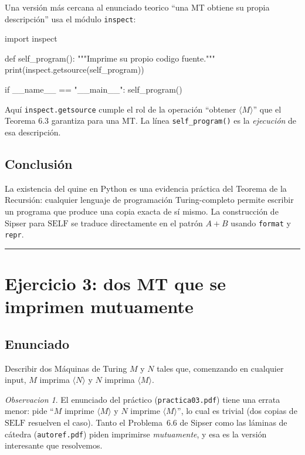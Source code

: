\documentclass[11pt,a4paper]{article}
\theoremstyle{plain}
\theoremstyle{definition}
\theoremstyle{remark}
\newtheorem*{observacion}{Observacion}
\newcommand{\enc}[1]{\langle #1\rangle}
\newcommand{\SELF}{\mathrm{SELF}}
\begin{document}
Una versi\'on m\'as cercana al enunciado teorico ``una MT obtiene su propia
descripci\'on'' usa el m\'odulo \texttt{inspect}:

\begin{pycode}
import inspect

def self_program():
    """Imprime su propio codigo fuente."""
    print(inspect.getsource(self_program))

if __name__ == "__main__":
    self_program()
\end{pycode}

Aqu\'i \texttt{inspect.getsource} cumple el rol de la operaci\'on
``obtener $\enc{M}$'' que el Teorema 6.3 garantiza para una MT. La l\'inea
\texttt{self\_program()} es la \emph{ejecuci\'on} de esa descripci\'on.

\subsection*{Conclusi\'on}

La existencia del quine en Python es una evidencia pr\'actica del Teorema de
la Recursi\'on: cualquier lenguaje de programaci\'on Turing-completo permite
escribir un programa que produce una copia exacta de s\'i mismo. La
construcci\'on de Sipser para $\SELF$ se traduce directamente en el patr\'on
$A+B$ usando \texttt{format} y \texttt{repr}.

\bigskip\hrule\bigskip

\section{Ejercicio 3: dos MT que se imprimen mutuamente}
\label{sec:ej3}

\subsection*{Enunciado}

Describir dos M\'aquinas de Turing $M$ y $N$ tales que, comenzando en
cualquier input, $M$ imprima $\enc{N}$ y $N$ imprima $\enc{M}$.

\begin{observacion}
El enunciado del pr\'actico (\texttt{practica03.pdf}) tiene una errata menor:
pide ``$M$ imprime $\enc{M}$ y $N$ imprime $\enc{M}$'', lo cual es trivial
(dos copias de $\SELF$ resuelven el caso). Tanto el Problema~6.6 de Sipser
como las l\'aminas de c\'atedra (\texttt{autoref.pdf}) piden imprimirse
\emph{mutuamente}, y esa es la versi\'on interesante que resolvemos.
\end{observacion}
\end{document}
